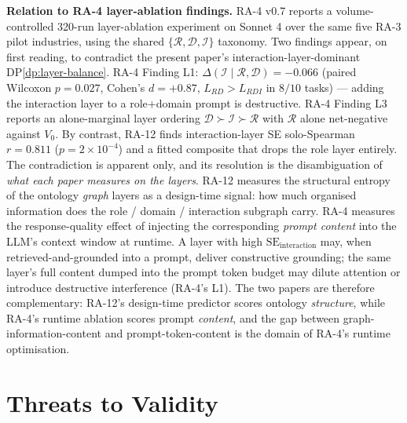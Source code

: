 \documentclass[11pt,a4paper]{article}
\newcommand{\se}{\mathrm{SE}}
\newcommand{\seint}{\se_{\text{interaction}}}
\begin{document}
\textbf{Relation to RA-4 layer-ablation findings.} RA-4 v0.7 reports a
volume-controlled 320-run layer-ablation experiment on Sonnet 4 over
the same five RA-3 pilot industries, using the shared
$\{\mathcal{R}, \mathcal{D}, \mathcal{I}\}$ taxonomy. Two findings
appear, on first reading, to contradict the present paper's
interaction-layer-dominant DP\ref{dp:layer-balance}. RA-4 Finding L1:
$\Delta(\mathcal{I} \mid \mathcal{R}, \mathcal{D}) = -0.066$
(paired Wilcoxon $p = 0.027$, Cohen's $d = +0.87$,
$L_{RD} > L_{RDI}$ in $8/10$ tasks) --- adding the interaction layer
to a role+domain prompt is destructive. RA-4 Finding L3 reports an
alone-marginal layer ordering
$\mathcal{D} \succ \mathcal{I} \succ \mathcal{R}$ with $\mathcal{R}$
alone net-negative against $V_0$. By contrast, RA-12 finds
interaction-layer SE solo-Spearman $r = 0.811$
($p = 2 \times 10^{-4}$) and a fitted composite that drops the role
layer entirely. The contradiction is apparent only, and its resolution
is the disambiguation of \emph{what each paper measures on the
layers}. RA-12 measures the structural entropy of the ontology
\emph{graph} layers as a design-time signal: how much organised
information does the role / domain / interaction subgraph carry. RA-4
measures the response-quality effect of injecting the corresponding
\emph{prompt content} into the LLM's context window at runtime. A
layer with high $\seint$ may, when retrieved-and-grounded into a
prompt, deliver constructive grounding; the same layer's full content
dumped into the prompt token budget may dilute attention or introduce
destructive interference (RA-4's L1). The two papers are therefore
complementary: RA-12's design-time predictor scores ontology
\emph{structure}, while RA-4's runtime ablation scores prompt
\emph{content}, and the gap between graph-information-content and
prompt-token-content is the domain of RA-4's runtime optimisation.

\section{Threats to Validity}
\label{sec:threats}
\end{document}

